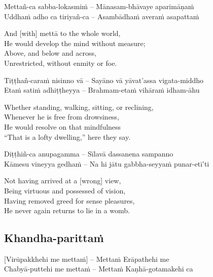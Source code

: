
Mettañ-ca sabba-lokasmiṁ – Mānasam-bhāvaye aparimāṇaṁ\\
Uddhaṁ adho ca tiriyañ-ca – Asambādhaṁ averaṁ asapattaṁ

\begin{english}
  And [with] mettā to the whole world,\\
  He would develop the mind without measure;\\
  Above, and below and across,\\
  Unrestricted, without enmity or foe.
\end{english}

Tiṭṭhañ-caraṁ nisinno vā – Sayāno vā yāvat’assa vigata-middho\\
Etaṁ satiṁ adhiṭṭheyya – Brahmam-etaṁ vihāraṁ idham-āhu

\begin{english}
  Whether standing, walking, sitting, or reclining,\\
  Whenever he is free from drowsiness,\\
  He would resolve on that mindfulness\\
  “That is a lofty dwelling,” here they say.
\end{english}

Diṭṭhiñ-ca anupagamma – Sīlavā dassanena sampanno\\
Kāmesu vineyya gedhaṁ – Na hi jātu gabbha-seyyaṁ punar-etī’ti

\begin{english}
  Not having arrived at a [wrong] view,\\
  Being virtuous and possessed of vision,\\
  Having removed greed for sense pleasures,\\
  He never again returns to lie in a womb.
\end{english}

\suttaRef{[Snp 1.8]}

\subsection{Khandha-parittaṁ}
\label{khandha-parittam}
[Virūpakkhehi me mettaṁ] – Mettaṁ Erāpathehi me\\
Chabyā-puttehi me mettaṁ – Mettaṁ Kaṇhā-gotamakehi ca

